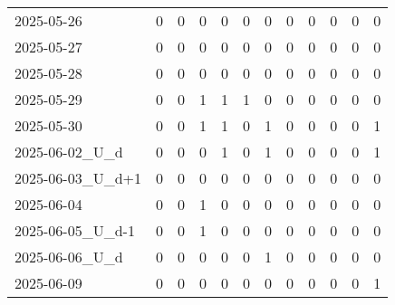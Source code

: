 \documentclass[dvipdfmx,oneside]{article}
\begin{document}
\begin{tabular}{lccccccccccc}
        2025-05-26 &     0 &     0 &     0 &     0 &     0 &     0 &     0 &     0 &     0 &     0 &     0 \\
        2025-05-27 &     0 &     0 &     0 &     0 &     0 &     0 &     0 &     0 &     0 &     0 &     0 \\
        2025-05-28 &     0 &     0 &     0 &     0 &     0 &     0 &     0 &     0 &     0 &     0 &     0 \\
        2025-05-29 &     0 &     0 &     1 &     1 &     1 &     0 &     0 &     0 &     0 &     0 &     0 \\
        2025-05-30 &     0 &     0 &     1 &     1 &     0 &     1 &     0 &     0 &     0 &     0 &     1 \\
  2025-06-02\_U\_d &     0 &     0 &     0 &     1 &     0 &     1 &     0 &     0 &     0 &     0 &     1 \\
2025-06-03\_U\_d+1 &     0 &     0 &     0 &     0 &     0 &     0 &     0 &     0 &     0 &     0 &     0 \\
        2025-06-04 &     0 &     0 &     1 &     0 &     0 &     0 &     0 &     0 &     0 &     0 &     0 \\
2025-06-05\_U\_d-1 &     0 &     0 &     1 &     0 &     0 &     0 &     0 &     0 &     0 &     0 &     0 \\
  2025-06-06\_U\_d &     0 &     0 &     0 &     0 &     0 &     1 &     0 &     0 &     0 &     0 &     0 \\
        2025-06-09 &     0 &     0 &     0 &     0 &     0 &     0 &     0 &     0 &     0 &     0 &     1 \\
\bottomrule
\end{tabular}
\endgroup
\end{document}
